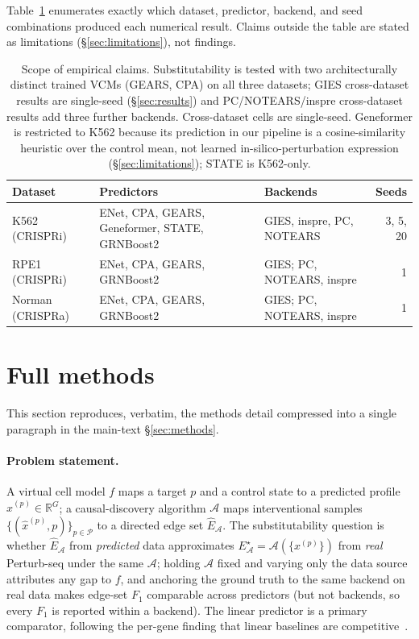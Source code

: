 \documentclass{article}
\theoremstyle{plain}
\theoremstyle{definition}
\theoremstyle{remark}
\begin{document}
Table~\ref{tab:scope} enumerates exactly which dataset, predictor, backend, and seed combinations produced each numerical result. Claims outside the table are stated as limitations (\S\ref{sec:limitations}), not findings.

\begin{table}[h]
\centering
\small
\begin{tabular}{l p{6.1cm} l r}
\toprule
\textbf{Dataset} & \textbf{Predictors} & \textbf{Backends} & \textbf{Seeds} \\
\midrule
K562 (CRISPRi)   & ENet, CPA, GEARS, Geneformer, STATE, GRNBoost2 & GIES, inspre, PC, NOTEARS & 3, 5, 20 \\
RPE1 (CRISPRi)   & ENet, CPA, GEARS, GRNBoost2                    & GIES; PC, NOTEARS, inspre & 1 \\
Norman (CRISPRa) & ENet, CPA, GEARS, GRNBoost2                    & GIES; PC, NOTEARS, inspre & 1 \\
\bottomrule
\end{tabular}
\caption{Scope of empirical claims. Substitutability is tested with two architecturally distinct trained VCMs (GEARS, CPA) on all three datasets; GIES cross-dataset results are single-seed (\S\ref{sec:results}) and PC/NOTEARS/inspre cross-dataset results add three further backends. Cross-dataset cells are single-seed. Geneformer is restricted to K562 because its prediction in our pipeline is a cosine-similarity heuristic over the control mean, not learned in-silico-perturbation expression (\S\ref{sec:limitations}); STATE is K562-only.}
\label{tab:scope}
\end{table}

\section{Full methods}
\label{app:full-methods}

This section reproduces, verbatim, the methods detail compressed into a single paragraph in the main-text \S\ref{sec:methods}.

\paragraph{Problem statement.}
A virtual cell model $f$ maps a target $p$ and a control state to a predicted profile $\hat{x}^{(p)}\in\mathbb{R}^{G}$; a causal-discovery algorithm $\mathcal{A}$ maps interventional samples $\{(\hat{x}^{(p)},p)\}_{p\in\mathcal{P}}$ to a directed edge set $\hat{E}_{\mathcal{A}}$. The substitutability question is whether $\hat{E}_{\mathcal{A}}$ from \emph{predicted} data approximates $E^{\star}_{\mathcal{A}}=\mathcal{A}(\{x^{(p)}\})$ from \emph{real} Perturb-seq under the same $\mathcal{A}$; holding $\mathcal{A}$ fixed and varying only the data source attributes any gap to $f$, and anchoring the ground truth to the same backend on real data makes edge-set $F_1$ comparable across predictors (but not backends, so every $F_1$ is reported within a backend). The linear predictor is a primary comparator, following the per-gene finding that linear baselines are competitive~\citep{ahlmanneltze2025}.
\end{document}
